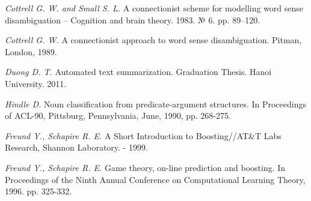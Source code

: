 \documentclass{article}
\begin{document}
\begin{articletext}
\begin{thebibliography}{9}
\textit{Cottrell G. W. and  Small S. L. }A connectionist  scheme for modelling word  sense  disambiguation -- Cognition and brain theory. 1983. № 6. pp. 89–120. 

\textit{Cottrell G. W. }A connectionist approach to word sense disambiguation. Pitman, London, 1989.

\textit{Duong D. T. }Automated text summarization. Graduation Thesis. Hanoi University. 2011. 

\textit{Hindle D. }Noun classification from predicate-argument structures. In Proceedings of ACL-90, Pittsburg, Pennsylvania, June, 1990, pp. 268-275.







\textit{Freund Y., Schapire R. E. }A Short Introduction to Boosting//AT\&T Labs Research, Shannon Laboratory. - 1999.

\textit{Freund Y.,  Schapire R. E. }Game theory, on-line prediction and boosting. In Proceedings of the Ninth Annual Conference on Computational Learning Theory,  1996. pp. 325-332.


\end{thebibliography}
\end{articletext}
\end{document}
